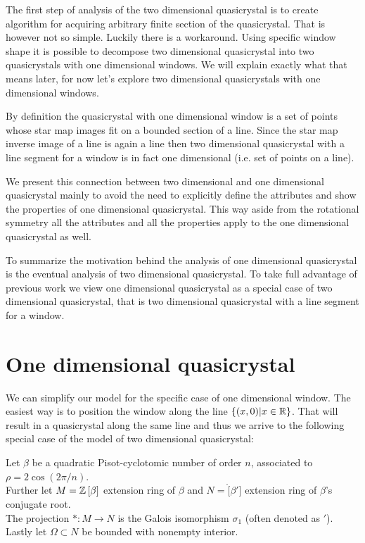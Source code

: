 \documentclass[text.tex]{subfiles}
\begin{document}
The first step of analysis of the two dimensional quasicrystal is to create algorithm for acquiring arbitrary finite section of the quasicrystal. That is however not so simple. Luckily there is a workaround. Using specific window shape it is possible to decompose two dimensional quasicrystal into two quasicrystals with one dimensional windows. We will explain exactly what that means later, for now let's explore two dimensional quasicrystals with one dimensional windows. 

By definition the quasicrystal with one dimensional window is a set of points whose star map images fit on a bounded section of a line. Since the star map inverse image of a line is again a line then two dimensional quasicrystal with a line segment for a window is in fact one dimensional (i.e. set of points on a line). 

We present this connection between two dimensional and one dimensional quasicrystal mainly to avoid the need to explicitly define the attributes and show the properties of one dimensional quasicrystal. This way aside from the rotational symmetry all the attributes and all the properties apply to the one dimensional quasicrystal as well. 

To summarize the motivation behind the analysis of one dimensional quasicrystal is the eventual analysis of two dimensional quasicrystal. To take full advantage of previous work we view one dimensional quasicrystal as a special case of two dimensional quasicrystal, that is two dimensional quasicrystal with a line segment for a window. 

\section{One dimensional quasicrystal}
We can simplify our model for the specific case of one dimensional window. The easiest way is to position the window along the line $\{(x,0)|x\in\mathbb{R}\}$. That will result in a quasicrystal along the same line and thus we arrive to the following special case of the model of two dimensional quasicrystal: 

Let $\beta$ be a quadratic Pisot-cyclotomic number of order $n$, associated to $\rho = 2\cos\left(2\pi/n\right)$. \\
Further let $M = \mathbb{Z}\left[\beta\right]$ extension ring of $\beta$ and $N = \ring[\beta']$ extension ring of $\beta$'s conjugate root. \\
The projection $\ast:M\rightarrow N$ is the Galois isomorphism $\sigma_1$ (often denoted as $'$). \\
Lastly let $\Omega\subset N$ be bounded with nonempty interior. 
\end{document}
